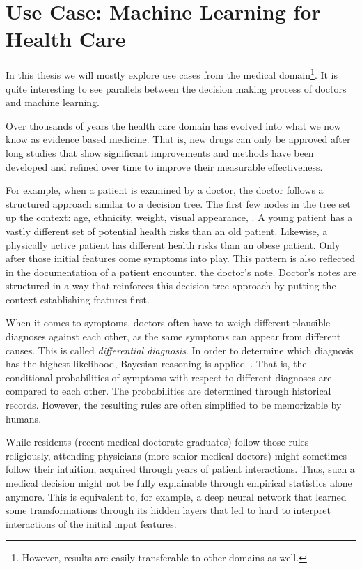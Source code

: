 \section{Use Case: Machine Learning for Health Care}
\label{sec:usecase}
In this thesis we will mostly explore use cases from the medical domain\footnote{However, results are easily transferable to other domains as well.}.
It is quite interesting to see parallels between the decision making process of doctors and machine learning.

Over thousands of years the health care domain has evolved into what we now know as evidence based medicine.
That is, new drugs can only be approved after long studies that show significant improvements and methods have been developed and refined over time to improve their measurable effectiveness.

For example, when a patient is examined by a doctor, the doctor follows a structured approach similar to a decision tree.
The first few nodes in the tree set up the context: age, ethnicity, weight, visual appearance, \etc.
A young patient has a vastly different set of potential health risks than an old patient.
Likewise, a physically active patient has different health risks than an obese patient.
Only after those initial features come symptoms into play.
This pattern is also reflected in the documentation of a patient encounter, the doctor's note.
Doctor's notes are structured in a way that reinforces this decision tree approach by putting the context establishing features first.

When it comes to symptoms, doctors often have to weigh different plausible diagnoses against each other, as the same symptoms can appear from different causes.
This is called \emph{differential diagnosis}.
In order to determine which diagnosis has the highest likelihood, Bayesian reasoning is applied~\cite{mdbook}.
That is, the conditional probabilities of symptoms with respect to different diagnoses are compared to each other.
The probabilities are determined through historical records.
However, the resulting rules are often simplified to be memorizable by humans.

While residents (recent medical doctorate graduates) follow those rules religiously, attending physicians (more senior medical doctors) might sometimes follow their intuition, acquired through years of patient interactions.
Thus, such a medical decision might not be fully explainable through empirical statistics alone anymore.
This is equivalent to, for example, a deep neural network that learned some transformations through its hidden layers that led to hard to interpret interactions of the initial input features.
